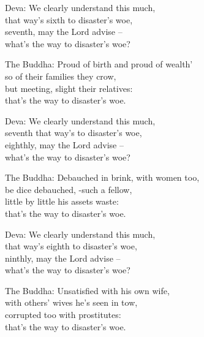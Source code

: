 \begin{MyDescription}{Deva:}   
We clearly understand this much,\\
that way's sixth to disaster's woe,\\
seventh, may the Lord advise – \\
what's the way to disaster's woe?
\end{MyDescription}
   
\begin{MyDescription}{The Buddha:}   
Proud of birth and proud of wealth'\\
so of their families they crow,\\
but meeting, slight their relatives:\\
that's the way to disaster's woe.
\end{MyDescription}  

\begin{MyDescription}{Deva:}   
We clearly understand this much,\\
seventh that way's to disaster's woe,\\
eighthly, may the Lord advise – \\
what's the way to disaster's woe?
\end{MyDescription} 


\begin{MyDescription}{The Buddha:}
Debauched in brink, with women too,\\
be dice debauched, -such a fellow,\\
little by little his assets waste:\\
that's the way to disaster's woe.
\end{MyDescription}    
   			
\begin{MyDescription}{Deva:}
We clearly understand this much,\\
that way's eighth to disaster's woe,\\
ninthly, may the Lord advise – \\
what's the way to disaster's woe?
\end{MyDescription}			   

\begin{MyDescription}{The Buddha:}
Unsatisfied with his own wife,\\
with others' wives he's seen in tow,\\
corrupted too with prostitutes:\\
that's the way to disaster's woe.
\end{MyDescription}	   

